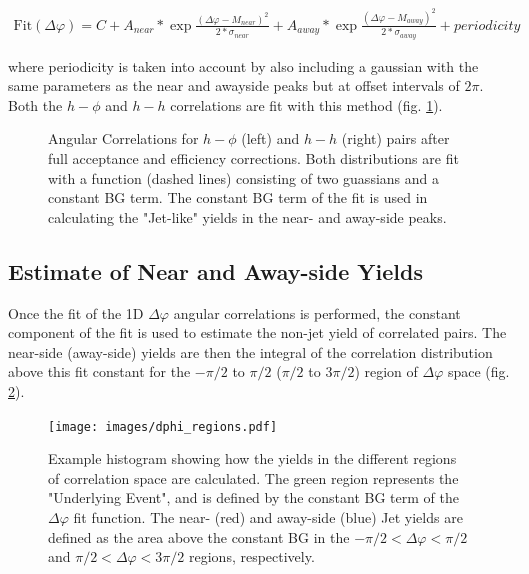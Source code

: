 \documentclass[ALICE,manyauthors]{ALICE_analysis_notes}
\begin{document}
\begin{align}
	\text{Fit}(\Delta\varphi) = C + A_{near}*\exp{\frac{(\Delta\varphi - M_{near})^2}{2*\sigma_{near}}} + A_{away}*\exp{\frac{(\Delta\varphi - M_{away})^2}{2*\sigma_{away}}} + \textit{periodicity}
\end{align}

where periodicity is taken into account by also including a gaussian with the same parameters as the near and awayside peaks but at offset intervals of $2\pi$. Both the $h-\phi$ and $h-h$ correlations are fit with this method (fig. \ref{dphi}).
\begin{figure}[ht]
\begin{subfigure}{
\texttt{[image: images/dphi\_hPhi\_0\_20.pdf]}}
\end{subfigure}
\begin{subfigure}{
\texttt{[image: images/dphi\_hh\_0\_20.pdf]}}
\end{subfigure}
\caption{Angular Correlations for $h-\phi$ (left) and $h-h$ (right) pairs after full acceptance and efficiency corrections.  Both distributions are fit with a function (dashed lines) consisting of two guassians and a constant BG term. The constant BG term of the fit is used in calculating the "Jet-like" yields in the near- and away-side peaks.}
\label{dphi}
\end{figure}
\subsection{Estimate of Near and Away-side Yields}

Once the fit of the 1D $\Delta\varphi$ angular correlations is performed, the constant component of the fit is used to estimate the non-jet yield of correlated pairs.  The near-side (away-side) yields are then the integral of the correlation distribution above this fit constant for the $-\pi/2$ to $\pi/2$ ($\pi/2$ to $3\pi/2$) region of $\Delta\varphi$ space (fig. \ref{regions}).

\begin{figure}[ht]
\centering
\texttt{[image: images/dphi\_regions.pdf]}
\caption{Example histogram showing how the yields in the different regions of correlation space are calculated.  The green region represents the "Underlying Event", and is defined by the constant BG term of the $\Delta\varphi$ fit function.  The near- (red) and away-side (blue) Jet yields are defined as the area above the constant BG in the $-\pi/2 < \Delta\varphi < \pi/2$ and $\pi/2 < \Delta\varphi < 3\pi/2$ regions, respectively.}
\label{regions}
\end{figure}
\end{document}
